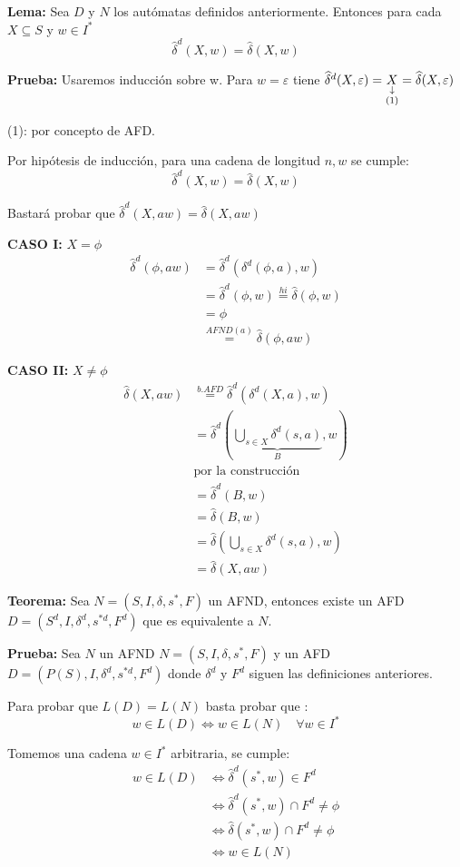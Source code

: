 \textbf{Lema: }Sea $D$ y $N$ los autómatas definidos anteriormente. Entonces para cada $X\subseteq S$ y $w\in I^*$
$$\widehat{\delta}^d(X,w)=\widehat{\delta}(X,w)$$

\textbf{Prueba: }Usaremos inducción sobre \textbar w\textbar. Para $w=\varepsilon$ tiene $\widehat{\delta}^d(X,\varepsilon)=\downlegend{X}{(1)}=\widehat{\delta}(X,\varepsilon)$

(1): por concepto de AFD.

Por hipótesis de inducción, para una cadena de longitud $n, w$ se cumple:
$$\widehat{\delta}^d(X,w)=\widehat{\delta}(X,w)$$

Bastará probar que $\widehat{\delta}^d(X,aw)=\widehat{\delta}(X,aw)$

\textbf{CASO I: }$X=\phi$
\begin{align*}
\widehat{\delta}^d(\phi,aw)	&=\widehat{\delta}^d(\delta^d(\phi,a),w)	\\
			&=\widehat{\delta}^d(\phi,w)\stackrel{hi}{=}\widehat{\delta}(\phi,w)	\\
			&=\phi	\\
			&\stackrel{AFND(a)}{=}\widehat{\delta}(\phi,aw)
\end{align*}

\textbf{CASO II: }$X\not=\phi$
\begin{align*}
\widehat{\delta}(X,aw) &\stackrel{b.AFD}{=}\widehat{\delta}^d(\delta^d(X,a),w)	\\
		&=\widehat{\delta}^d\left(\underbrace{\bigcup_{s\in X}\delta^d(s,a)}_{B},w\right)	\\
		&\mbox{por la construcción}	\\
		&=\widehat{\delta}^d(B,w)	\\
		&=\widehat{\delta}(B,w)	\\
		&=\widehat{\delta}\left(\bigcup_{s\in X}\delta^d(s,a),w\right)	\\
		&=\widehat{\delta}(X,aw)
\end{align*}

\textbf{Teorema: }Sea $N=(S,I,\delta,s^*,F)$ un AFND, entonces existe un AFD $D=(S^d,I,\delta^d,s^{*d},F^d)$ que es equivalente a $N$.

\textbf{Prueba: }Sea $N$ un AFND $N=(S,I,\delta,s^*,F)$ y un AFD $D=(P(S),I,\delta^d,s^{*d},F^d)$ donde $\delta^d$ y $F^d$ siguen las definiciones anteriores.

Para probar que $L(D)=L(N)$ basta probar que :
$$w\in L(D) \Leftrightarrow w\in L(N)\quad \forall w\in I^*$$

Tomemos una cadena $w\in I^*$ arbitraria, se cumple:
\begin{align*}
w\in L(D)&\Leftrightarrow \widehat{\delta}^d(s^*,w) \in F^d	\\
		&\Leftrightarrow \widehat{\delta}^d(s^*,w)\cap F^d\not=\phi	\\
		&\Leftrightarrow \widehat{\delta}(s^*,w)\cap F^d\not=\phi	\\
		&\Leftrightarrow w\in L(N)
\end{align*}

